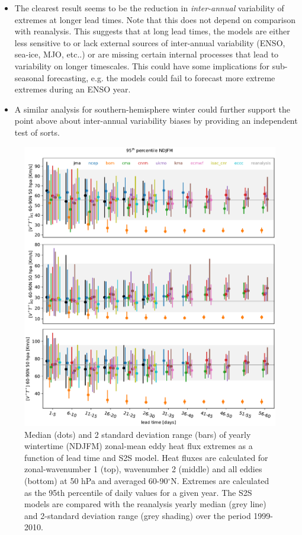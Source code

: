 \documentclass[12pt]{article}
\begin{document}
\begin{spacing}{1}
\begin{itemize}
\item The clearest result seems to be the reduction in {\it inter-annual} variability of extremes at longer lead times. Note that this does not depend on comparison with reanalysis. This suggests that at long lead times, the models are either less sensitive to or lack external sources of inter-annual variability (ENSO, sea-ice, MJO, etc..) or are missing certain internal processes that lead to variability on longer timescales. This could have some implications for sub-seasonal forecasting, e.g. the models could fail to forecast more extreme extremes during an ENSO year.

\item A similar analysis for southern-hemisphere winter could further support the point above about inter-annual variability biases by providing an independent test of sorts. 




\end{itemize}



\begin{figure}[H]
\centering
\includegraphics[scale=0.75]{fig_01.pdf}
\caption{Median (dots) and 2 standard deviation range (bars) of yearly wintertime (NDJFM) zonal-mean eddy heat flux extremes as a function of lead time and S2S model. Heat fluxes are calculated for zonal-wavenumber 1 (top), wavenumber 2 (middle) and all eddies (bottom) at 50 hPa and averaged 60-90$^{\circ}$N. Extremes are calculated as the 95th percentile of daily values for a given year. The S2S models are compared with the reanalysis yearly median (grey line) and 2-standard deviation range (grey shading) over the period 1999-2010.}
\label{f1}
\end{figure}



\end{spacing}
\end{document}
